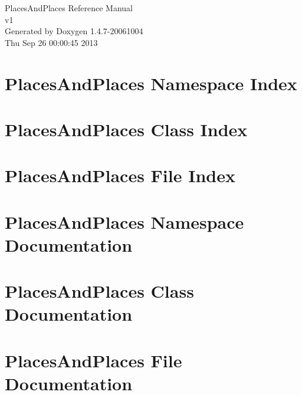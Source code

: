 \documentclass[a4paper]{book}
\begin{document}
\begin{titlepage}
\vspace*{7cm}
\begin{center}
{\Large Places\-And\-Places Reference Manual\\[1ex]\large v1 }\\
\vspace*{1cm}
{\large Generated by Doxygen 1.4.7-20061004}\\
\vspace*{0.5cm}
{\small Thu Sep 26 00:00:45 2013}\\
\end{center}
\end{titlepage}
\clearemptydoublepage
{}
\tableofcontents
\clearemptydoublepage
{}
\chapter{Places\-And\-Places Namespace Index}

\chapter{Places\-And\-Places Class Index}

\chapter{Places\-And\-Places File Index}

\chapter{Places\-And\-Places Namespace Documentation}

\chapter{Places\-And\-Places Class Documentation}

\chapter{Places\-And\-Places File Documentation}

\printindex
\end{document}
